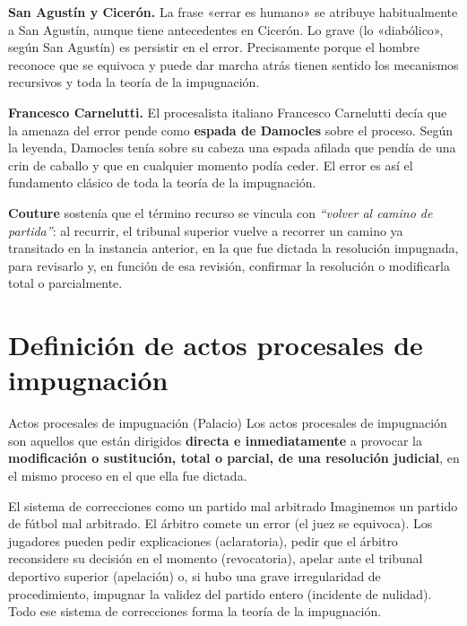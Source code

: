 \documentclass[12pt,oneside]{book}
\begin{document}
\begin{note}
\textbf{San Agustín y Cicerón.} La frase «errar es humano» se atribuye habitualmente a San Agustín, aunque tiene antecedentes en Cicerón. Lo grave (lo «diabólico», según San Agustín) es persistir en el error. Precisamente porque el hombre reconoce que se equivoca y puede dar marcha atrás tienen sentido los mecanismos recursivos y toda la teoría de la impugnación.
\end{note}

\begin{note}
\textbf{Francesco Carnelutti.} El procesalista italiano Francesco Carnelutti decía que la amenaza del error pende como \textbf{espada de Damocles} sobre el proceso. Según la leyenda, Damocles tenía sobre su cabeza una espada afilada que pendía de una crin de caballo y que en cualquier momento podía ceder. El error es así el fundamento clásico de toda la teoría de la impugnación.
\end{note}

\textbf{Couture} sosten\'ia que el t\'ermino recurso se vincula con \textit{``volver al camino de partida''}: al recurrir, el tribunal superior vuelve a recorrer un camino ya transitado en la instancia anterior, en la que fue dictada la resoluci\'on impugnada, para revisarlo y, en funci\'on de esa revisi\'on, confirmar la resoluci\'on o modificarla total o parcialmente.

\section{Definición de actos procesales de impugnación}

\begin{definition}{Actos procesales de impugnación (Palacio)}
Los actos procesales de impugnación son aquellos que están dirigidos \textbf{directa e inmediatamente} a provocar la \textbf{modificación o sustitución, total o parcial, de una resolución judicial}, en el mismo proceso en el que ella fue dictada.
\end{definition}

\begin{example}{El sistema de correcciones como un partido mal arbitrado}
Imaginemos un partido de fútbol mal arbitrado. El árbitro comete un error (el juez se equivoca). Los jugadores pueden pedir explicaciones (aclaratoria), pedir que el árbitro reconsidere su decisión en el momento (revocatoria), apelar ante el tribunal deportivo superior (apelación) o, si hubo una grave irregularidad de procedimiento, impugnar la validez del partido entero (incidente de nulidad). Todo ese sistema de correcciones forma la teoría de la impugnación.
\end{example}
\end{document}
